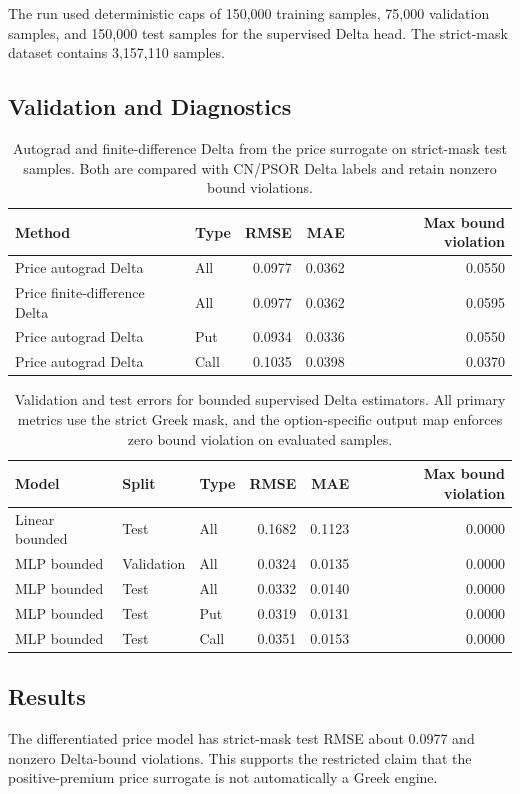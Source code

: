 \documentclass[11pt]{article}
\begin{document}
The run used deterministic caps of 150,000 training samples, 75,000 validation samples, and 150,000 test samples for the supervised Delta head. The strict-mask dataset contains 3,157,110 samples.

\subsection{Validation and Diagnostics}
\begin{table}[h]
\centering
\begin{tabular}{llrrr}
\toprule
Method & Type & RMSE & MAE & Max bound violation\\
\midrule
Price autograd Delta & All & 0.0977 & 0.0362 & 0.0550\\
Price finite-difference Delta & All & 0.0977 & 0.0362 & 0.0595\\
Price autograd Delta & Put & 0.0934 & 0.0336 & 0.0550\\
Price autograd Delta & Call & 0.1035 & 0.0398 & 0.0370\\
\bottomrule
\end{tabular}
\caption{Autograd and finite-difference Delta from the price surrogate on strict-mask test samples. Both are compared with CN/PSOR Delta labels and retain nonzero bound violations.}
\end{table}

\begin{table}[h]
\centering
\begin{tabular}{lllrrr}
\toprule
Model & Split & Type & RMSE & MAE & Max bound violation\\
\midrule
Linear bounded & Test & All & 0.1682 & 0.1123 & 0.0000\\
MLP bounded & Validation & All & 0.0324 & 0.0135 & 0.0000\\
MLP bounded & Test & All & 0.0332 & 0.0140 & 0.0000\\
MLP bounded & Test & Put & 0.0319 & 0.0131 & 0.0000\\
MLP bounded & Test & Call & 0.0351 & 0.0153 & 0.0000\\
\bottomrule
\end{tabular}
\caption{Validation and test errors for bounded supervised Delta estimators. All primary metrics use the strict Greek mask, and the option-specific output map enforces zero bound violation on evaluated samples.}
\end{table}

\subsection{Results}
The differentiated price model has strict-mask test RMSE about 0.0977 and nonzero Delta-bound violations. This supports the restricted claim that the positive-premium price surrogate is not automatically a Greek engine.
\end{document}
